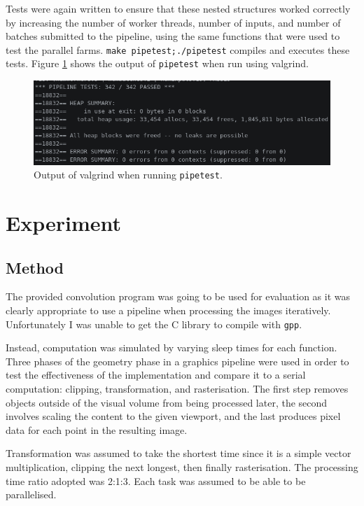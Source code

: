 \documentclass[12pt]{article}
\def\code#1{\texttt{#1}}
\begin{document}
Tests were again written to ensure that these nested structures worked correctly by increasing the number of worker threads, number of inputs, and number of batches submitted to the pipeline, using the same functions that were used to test the parallel farms. \code{make pipetest;./pipetest} compiles and executes these tests. Figure \ref{fig:pipetest} shows the output of \code{pipetest} when run using valgrind.

\begin{figure}[!ht]
	\centering 
	\includegraphics[width=0.8\linewidth]{images/pipetest}
	\caption{Output of valgrind when running \code{pipetest}.}
	\label{fig:pipetest}
\end{figure}

\section{Experiment}

\subsection{Method}
The provided convolution program was going to be used for evaluation as it was clearly appropriate to use a pipeline when processing the images iteratively. Unfortunately I was unable to get the C library to compile with \code{gpp}.

Instead, computation was simulated by varying sleep times for each function. Three phases of the geometry phase in a graphics pipeline were used in order to test the effectiveness of the implementation and compare it to a serial computation: clipping, transformation, and rasterisation. The first step removes objects outside of the visual volume from being processed later, the second involves scaling the content to the given viewport, and the last produces pixel data for each point in the resulting image. 

Transformation was assumed to take the shortest time since it is a simple vector multiplication, clipping the next longest, then finally rasterisation. The processing time ratio adopted was 2:1:3. Each task was assumed to be able to be parallelised. 
\end{document}
